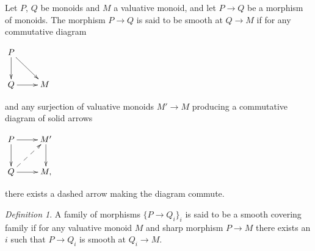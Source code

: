 \documentclass[12pt]{amsart}
\numberwithin{equation}{section}
\theoremstyle{plain}
\theoremstyle{remark}
\newtheorem{defn}[equation]{Definition}
\newcommand{\NN}{\mathbb N}
\begin{document}
Let $P$, $Q$ be monoids and $M$ a valuative monoid, and let $P\to Q$ be a morphism of monoids. The morphism $P\to Q$ is said to be smooth at $Q\to M$ if for any commutative diagram 
\begin{center}
	$\xymatrix{
		P \ar[d]\ar[dr]\\
		Q\ar[r] & M
	}$
\end{center}
and any surjection of valuative monoids $M'\to M$ producing a commutative diagram of solid arrows
\begin{center}
	$\xymatrix{
		P\ar[r]\ar[d] & M'\ar[d]\\
		Q\ar[r] \ar@{-->}[ur] & M,
	}$
\end{center}
there exists a dashed arrow making the diagram commute. 

\begin{defn}
A family of morphisms $\{P\to Q_i\}_i$ is said to be a smooth covering family if for any valuative monoid $M$ and sharp morphism $P\to M$ there exists an $i$ such that $P\to Q_i$ is smooth at $Q_i\to M$.
\end{defn}


\end{document}
